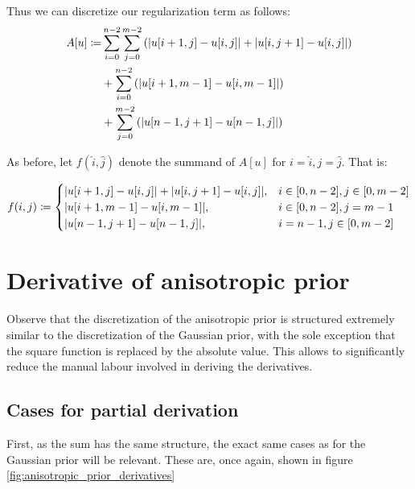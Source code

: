 \documentclass[a4paper]{scrreprt}
\DeclarePairedDelimiter\abs{\lvert}{\rvert}
\begin{document}
Thus we can discretize our regularization term as follows:
\begin{align*}
		A[u] \coloneqq 
		     & \sum_{i=0}^{n-2} \sum_{j=0}^{m-2} \left(\abs{u[i + 1, j] - u[i, j]} + \abs{u[i,j + 1] - u[i, j]}\right) \\
			 & + \sum_{i=0}^{n-2} \left(\abs{u[i + 1, m - 1] - u[i, m - 1]}\right) \\
			 & + \sum_{j=0}^{m-2} \left(\abs{u[n - 1, j + 1] - u[n - 1, j]}\right)
\end{align*}

As before, let $f(\hat{i}, \hat{j})$ denote the summand of $A[u]$ for $i =
\hat{i}, j = \hat{j}$.  That is:

\begin{align*}
		f(i, j) \coloneqq 
		\begin{cases}
				\abs{u[i + 1, j] - u[i, j]} + \abs{u[i, j + 1] - u[i, j]}, & i \in [0, n - 2], j \in [0, m - 2] \\
				\abs{u[i + 1, m - 1] - u[i, m - 1]}, & i \in [0, n - 2], j = m - 1 \\
				\abs{u[n - 1, j + 1] - u[n - 1, j]}, & i = n - 1, j \in [0, m - 2]
		\end{cases}
\end{align*}

\section{Derivative of anisotropic prior}
\label{sec:derivative_of_anisotropic}

Observe that the discretization of the anisotropic prior is structured
extremely similar to the discretization of the Gaussian prior, with the sole
exception that the square function is replaced by the absolute value. This
allows to significantly reduce the manual labour involved in deriving the
derivatives.

\subsection{Cases for partial derivation}

First, as the sum has the same structure, the exact same cases as for the
Gaussian prior will be relevant. These are, once again, shown in figure
\ref{fig:anisotropic_prior_derivatives}
\end{document}
